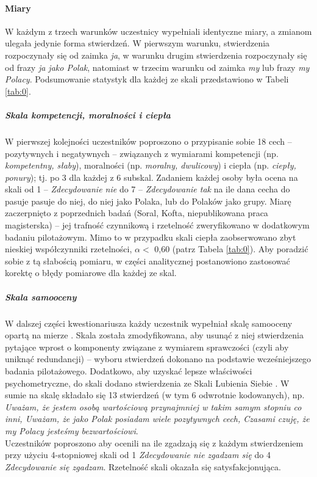 \documentclass[man]{apa6}
\begin{document}
\paragraph{Miary}
W każdym z trzech warunków uczestnicy wypełniali identyczne miary, a zmianom ulegała jedynie forma stwierdzeń. W pierwszym warunku, stwierdzenia rozpoczynały się od zaimka \emph{ja}, w warunku drugim stwierdzenia rozpoczynały się od frazy \emph{ja jako Polak}, natomiast w trzecim warunku od zaimka \emph{my} lub frazy \emph{my Polacy}. Podsumowanie statystyk dla każdej ze skali przedstawiono w Tabeli \ref{tab:0}.

\subparagraph{Skala kompetencji, moralności i ciepła}
W pierwszej kolejności uczestników poproszono o przypisanie sobie 18 cech -- pozytywnych i negatywnych -- związanych z wymiarami kompetencji (np. \emph{kompetentny, słaby}), moralności (np. \emph{moralny, dwulicowy}) i ciepła (np. \emph{ciepły, ponury}); tj. po 3 dla każdej z 6 subskal. Zadaniem każdej osoby była ocena na skali od 1 -- \emph{Zdecydowanie nie} do 7 -- \emph{Zdecydowanie tak} na ile dana cecha do pasuje pasuje do niej, do niej jako Polaka, lub do Polaków jako grupy. Miarę zaczerpnięto z poprzednich badań (Soral, Kofta, niepublikowana praca magisterska) -- jej trafność czynnikową i rzetelność zweryfikowano w dodatkowym badaniu pilotażowym. Mimo to w przypadku skali ciepła zaobserwowano zbyt nieskiej współczynniki rzetelności, $\alpha < $ 0,60  (patrz Tabela \ref{tab:0}). Aby poradzić sobie z tą słabością pomiaru, w części analitycznej postanowiono zastosować korektę o błędy pomiarowe dla każdej ze skal.

\subparagraph{Skala samooceny}
W dalszej części kwestionariusza każdy uczestnik wypełniał skalę samooceny opartą na mierze \textcite{rosenberg1965society}. Skala została zmodyfikowana, aby usunąć z niej stwierdzenia pytające wprost o komponenty związane z wymiarem sprawczości (czyli aby uniknąć redundancji) -- wyboru stwierdzeń dokonano na podstawie wcześniejszego badania pilotażowego. Dodatkowo, aby uzyskać lepsze właściwości psychometryczne, do skali dodano stwierdzenia ze Skali Lubienia Siebie \textcite{tafarodi2001two}. W sumie na skalę składało się 13 stwierdzeń (w tym 6 odwrotnie kodowanych), np. \emph{Uważam, że jestem osobą wartościową przynajmniej w takim samym stopniu co inni, Uważam, że jako Polak posiadam wiele pozytywnych cech, Czasami czuję, że my Polacy jesteśmy bezwartościowi}.\\

Uczestników poproszono aby ocenili na ile zgadzają się z każdym stwierdzeniem przy użyciu 4-stopniowej skali od 1 \emph{Zdecydowanie nie zgadzam się} do 4 \emph{Zdecydowanie się zgadzam}. Rzetelność skali okazała się satysfakcjonująca. \\
\end{document}
